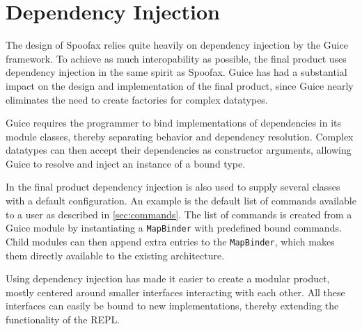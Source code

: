 \section{Dependency Injection}
\label{sec:injection}

The design of Spoofax relies quite heavily on dependency injection by the Guice
framework.  To achieve as much interopability as possible, the final product
uses dependency injection in the same spirit as Spoofax. Guice has had a
substantial impact on the design and implementation of the final product, since
Guice nearly eliminates the need to create factories for complex datatypes.

Guice requires the programmer to bind implementations of dependencies in its
module classes, thereby separating behavior and dependency resolution.  Complex
datatypes can then accept their dependencies as constructor arguments, allowing
Guice to resolve and inject an instance of a bound type.

In the final product dependency injection is also used to supply several classes
with a default configuration.  An example is the default list of commands
available to a user as described in \cref{sec:commands}.  The list of commands
is created from a Guice module by instantiating a \texttt{MapBinder} with
predefined bound commands. Child modules can then append extra entries to the
\texttt{MapBinder}, which makes them directly available to the existing
architecture.

Using dependency injection has made it easier to create a modular product,
mostly centered around smaller interfaces interacting with each other. All these
interfaces can easily be bound to new implementations, thereby extending the
functionality of the REPL.
